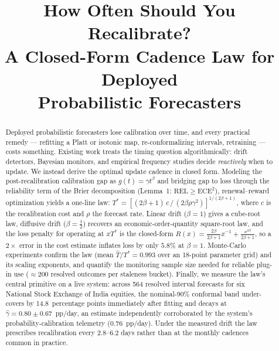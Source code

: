 \documentclass[conference]{IEEEtran}
\begin{document}
\title{How Often Should You Recalibrate?\\
A Closed-Form Cadence Law for Deployed\\ Probabilistic Forecasters}

\author{
}

\maketitle

\begin{abstract}
Deployed probabilistic forecasters lose calibration over time, and every
practical remedy --- refitting a Platt or isotonic map, re-conformalizing
intervals, retraining --- costs something. Existing work treats the timing
question algorithmically: drift detectors, Bayesian monitors, and empirical
frequency studies decide \emph{reactively} when to update. We instead derive
the optimal update cadence in closed form. Modeling the post-recalibration
calibration gap as $g(t)=\gamma t^{\beta}$ and bridging gap to loss through the
reliability term of the Brier decomposition (Lemma~1: $\mathrm{REL}\ge
\mathrm{ECE}^2$), renewal--reward optimization yields a one-line law:
$T^{*}=\left[(2\beta+1)\,c\,/\,(2\beta\rho\gamma^{2})\right]^{1/(2\beta+1)}$,
where $c$ is the recalibration cost and $\rho$ the forecast rate. Linear drift
($\beta{=}1$) gives a cube-root law, diffusive drift ($\beta{=}\tfrac12$)
recovers an economic-order-quantity square-root law, and the loss penalty for
operating at $xT^{*}$ is the closed-form $R(x)=\frac{2\beta}{2\beta+1}x^{-1}
+\frac{x^{2\beta}}{2\beta+1}$, so a $2\times$ error in the cost estimate
inflates loss by only $5.8\%$ at $\beta{=}1$. Monte-Carlo experiments confirm
the law (mean $\hat T/T^{*}=0.993$ over an 18-point parameter grid) and its
scaling exponents, and quantify the monitoring sample size needed for reliable
plug-in use ($\approx 200$ resolved outcomes per staleness bucket). Finally,
we measure the law's central primitive on a live system: across 564 resolved
interval forecasts for six National Stock Exchange of India equities, the
nominal-90\% conformal band under-covers by 14.8~percentage points immediately
after fitting and decays at $\hat\gamma=0.80\pm0.67$~pp/day, an estimate
independently corroborated by the system's probability-calibration telemetry
(0.76~pp/day). Under the measured drift the law prescribes recalibration every
2.8--6.2 days rather than at the monthly cadences common in practice.
\end{abstract}
\end{document}
